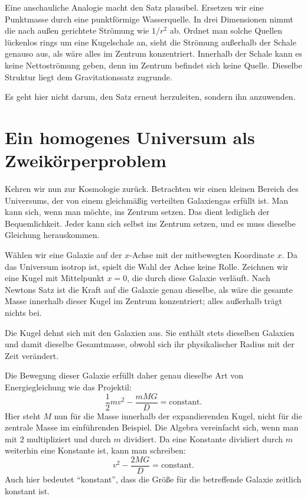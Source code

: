 Eine anschauliche Analogie macht den Satz plausibel. Ersetzen wir eine Punktmasse durch eine punktförmige Wasserquelle. In drei Dimensionen nimmt die nach außen gerichtete Strömung wie \(1/r^2\) ab. Ordnet man solche Quellen lückenlos rings um eine Kugelschale an, sieht die Strömung außerhalb der Schale genauso aus, als wäre alles im Zentrum konzentriert. Innerhalb der Schale kann es keine Nettoströmung geben, denn im Zentrum befindet sich keine Quelle. Dieselbe Struktur liegt dem Gravitationssatz zugrunde.

Es geht hier nicht darum, den Satz erneut herzuleiten, sondern ihn anzuwenden.

\section{Ein homogenes Universum als Zweikörperproblem}

Kehren wir nun zur Kosmologie zurück. Betrachten wir einen kleinen Bereich des Universums, der von einem gleichmäßig verteilten Galaxiengas erfüllt ist. Man kann sich, wenn man möchte, ins Zentrum setzen. Das dient lediglich der Bequemlichkeit. Jeder kann sich selbst ins Zentrum setzen, und es muss dieselbe Gleichung herauskommen.

Wählen wir eine Galaxie auf der \(x\)-Achse mit der mitbewegten Koordinate \(x\). Da das Universum isotrop ist, spielt die Wahl der Achse keine Rolle. Zeichnen wir eine Kugel mit Mittelpunkt \(x=0\), die durch diese Galaxie verläuft. Nach Newtons Satz ist die Kraft auf die Galaxie genau dieselbe, als wäre die gesamte Masse innerhalb dieser Kugel im Zentrum konzentriert; alles außerhalb trägt nichts bei.

Die Kugel dehnt sich mit den Galaxien aus. Sie enthält stets dieselben Galaxien und damit dieselbe Gesamtmasse, obwohl sich ihr physikalischer Radius mit der Zeit verändert.

Die Bewegung dieser Galaxie erfüllt daher genau dieselbe Art von Energiegleichung wie das Projektil:
\begin{equation}
\frac{1}{2}mv^2-\frac{mMG}{D}=\text{constant}.
\end{equation}
Hier steht \(M\) nun für die Masse innerhalb der expandierenden Kugel, nicht für die zentrale Masse im einführenden Beispiel. Die Algebra vereinfacht sich, wenn man mit \(2\) multipliziert und durch \(m\) dividiert. Da eine Konstante dividiert durch \(m\) weiterhin eine Konstante ist, kann man schreiben:
\begin{equation}
v^2-\frac{2MG}{D}=\text{constant}.
\end{equation}
Auch hier bedeutet ``konstant'', dass die Größe für die betreffende Galaxie zeitlich konstant ist.

